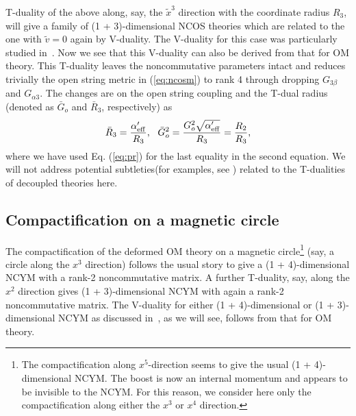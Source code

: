 \documentclass[a4paper,12pt]{article}
\begin{document}
	T-duality of the above along, say, the $\tilde x^3$ direction with the 
coordinate radius $R_3$, will give a family of (1 + 3)-dimensional NCOS 
theories which are related to the one with $\tilde v = 0$ again by
V-duality. The V-duality for this  case was particularly studied
in~\cite{CW,CLW}.
Now we see that this V-duality can also be derived from that for OM
theory. This T-duality leaves the noncommutative parameters
intact and reduces trivially the open string metric in (\ref{eq:ncosm})
to rank 4 through dropping $G_{3\beta}$ and $G_{\alpha 3}$. The changes
are on the open string coupling and the T-dual radius (denoted as $\bar
G_o$
and  $\bar
R_3$, respectively) as
\begin{equation}
\bar R_3 = \frac{\alpha'_{\rm eff}}{R_3}, \ \ \bar G^2_o = \frac{G^2_o 
\sqrt{\alpha'_{\rm eff}}}{R_3} = \frac{R_2}{R_3},
\end{equation}
where we have used Eq. (\ref{eq:pr}) for the last equality in the second
equation. We will not address potential subtleties(for examples, 
see \cite{klem,kawt,dangkone,dangktwo}) related to the
T-dualities of decoupled theories here. 

\subsection{Compactification on a magnetic circle}

	The compactification of the deformed OM theory on a magnetic
circle\footnote{The
compactification along $x^5$-direction seems to give the usual 
(1 + 4)-dimensional NCYM. The boost is now an internal momentum and
appears to be invisible to the NCYM. For this reason, we consider here
only the compactification along either the $x^3$ or $x^4$ direction.} 
(say, a circle along the $x^3$ direction) follows the usual story 
to give a (1 + 4)-dimensional NCYM with a rank-2 noncommutative matrix.
A further T-duality, say, along the $x^2$ direction gives (1 +
3)-dimensional NCYM with again a rank-2 noncommutative matrix. The
V-duality for either (1 + 4)-dimensional or (1 + 3)-dimensional NCYM as 
discussed in~\cite{CLW}, as we will see, follows from that for OM theory.
\end{document}
